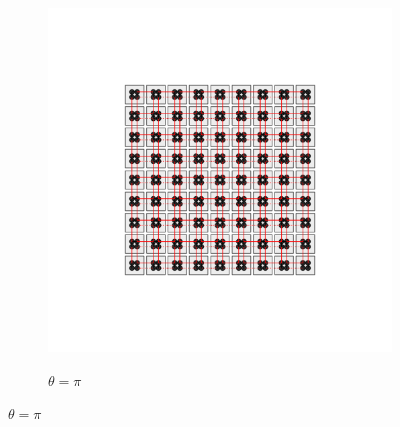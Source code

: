 \begin{figure}[h!]
\begin{minipage}[h!]{1\textwidth}
\begin{subfigure}[b!]{0.2 \textwidth}
             \label{}
         \end{subfigure}\hspace*{-0.5em}
         \begin{subfigure}[b!]{0.2 \textwidth}
             \caption*{$\theta = \pi$}
             \includegraphics[width=\textwidth]{Imagenes/Models/Model_pump/square_pump_model_xy_16.pdf}
             \label{}
         \end{subfigure}\hspace*{-0.5em}
     \end{minipage}\vspace*{-1em}
     

\end{figure}
